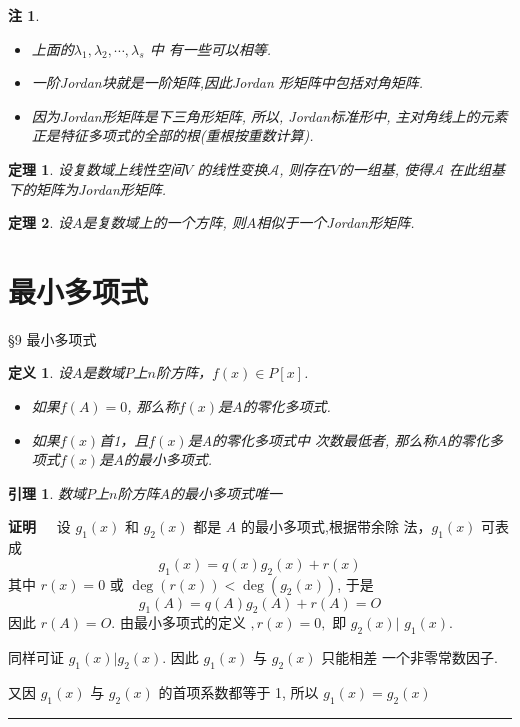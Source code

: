 \documentclass[13pt]{beamer}
\newtheorem{thm}{定理}
\newtheorem{lem}{引理}
\newtheorem*{defi}{定义}
\newtheorem*{rem}{注}
\def\qed{\nopagebreak\hfill{\rule{4pt}{7pt}}\medbreak}
\def\pf{{\bf 证明~~ }}
\def\A{\mathscr{A}}
\begin{document}
\begin{frame}
\begin{rem}
\begin{itemize}
	\item 上面的$\lambda_{1}, \lambda_{2}, \cdots, \lambda_s$ 中
	有一些可以相等.
	\item 一阶Jordan块就是一阶矩阵,因此Jordan 形矩阵中包括对角矩阵.
	\item 因为Jordan形矩阵是下三角形矩阵, 所以, Jordan标准形中, 主对角线上的元素正是特征多项式的全部的根(重根按重数计算).
\end{itemize}
\end{rem}


\end{frame}
\begin{frame}
\begin{thm}
设复数域上线性空间$V$ 的线性变换$\A$, 则存在$V$的一组基, 使得$\A$ 在此组基下的矩阵为Jordan形矩阵.
\end{thm}



\begin{thm}
	设$A$是复数域上的一个方阵,
则$A$相似于一个Jordan形矩阵. 
\end{thm}


\end{frame}



\section{最小多项式}
\begin{frame}{\S 9  最小多项式}
\begin{defi}
设$A$是数域$P$上$n$阶方阵，$f(x)\in P[x]$. 
\begin{itemize}
\item 如果$f(A)=0$, 那么称$f(x)$是$A$的\alert{零化多项式}.
\item 如果$f(x)$首1，且$f(x)$是A的零化多项式中
次数最低者, 那么称$A$的零化多项式$f(x)$是$A$的\alert{最小多项式}.
\end{itemize}
\end{defi}
\end{frame}


\begin{frame}
\begin{lem}
数域$P$上$n$阶方阵$A$的最小多项式唯一
\end{lem}
\pf 
设 $g_{1}(x)$ 和 $g_{2}(x)$ 都是 ${A}$ 的最小多项式,根据带余除
法，$g_1(x)$ 可表成
\[
g_{1}(x)=q(x) g_{2}(x)+r(x)
\]
其中 $r(x)=0$ 或 $\deg(r(x))<\deg \left(g_{2}(x)\right)$, 于是
\[
g_{1}({A})=q({A}) g_{2}({A})+r({A})={O}
\]
因此 $r({A})={O} .$ 由最小多项式的定义 $, r(x)=0,$ 即 $g_{2}(x) |$
$g_{1}(x)$. 

同样可证 $g_{1}(x) | g_{2}(x) .$ 因此 $g_{1}(x)$ 与 $g_{2}(x)$ 只能相差 一个非零常数因子.

又因 $g_{1}(x)$ 与 $g_{2}(x)$ 的首项系数都等于 1, 所以 $g_{1}(x)=g_{2}(x)$
\qed
\end{frame}
\end{document}
